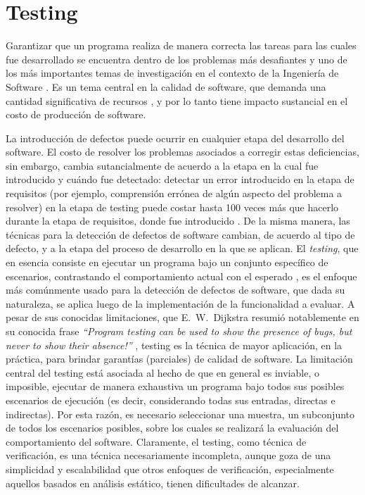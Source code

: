 \chapter[Testing]{Testing}
\label{cap:preliminares.testing}

Garantizar que un programa realiza de manera correcta las tareas para las cuales fue desarrollado se encuentra dentro de los problemas m\'as desafiantes y uno de los m\'as importantes temas de investigaci\'on en el contexto de la Ingenier\'ia de Software \cite{bibliography.books.GhezziBook,bibliography.books.PressmanBook,DBLP:series/txcs/Jalote05}. Es un tema central en la calidad de software, que demanda una cantidad significativa de recursos \cite{bibliography.books.JaloteBook}, y por lo tanto tiene impacto sustancial en el costo de producci\'on de software. 

La introducci\'on de defectos puede ocurrir en cualquier etapa del desarrollo del software. El costo de resolver los problemas asociados a corregir estas deficiencias, sin embargo, cambia sutancialmente de acuerdo a la etapa en la cual fue introducido y cu\'ando fue detectado: detectar un error introducido en la etapa de requisitos (por ejemplo, comprensi\'on err\'onea de alg\'un aspecto del problema a resolver) en la etapa de testing puede costar hasta 100 veces m\'as que hacerlo durante la etapa de requisitos, donde fue introducido \cite{bibliography.books.JaloteBook}. De la misma manera, las t\'ecnicas para la detecci\'on de defectos de software cambian, de acuerdo al tipo de defecto, y a la etapa del proceso de desarrollo en la que se aplican. El \emph{testing}, que en esencia consiste en ejecutar un programa bajo un conjunto espec\'ifico de escenarios, contrastando el comportamiento actual con el esperado \cite{bibliography.books.AmmannOffutt}, es el enfoque m\'as com\'unmente usado para la detecci\'on de defectos de software, que dada su naturaleza, se aplica luego de la implementaci\'on de la funcionalidad a evaluar. A pesar de sus conocidas limitaciones, que E.~W.~Dijkstra resumi\'o notablemente en su conocida frase \emph{``Program testing can be used to show the presence of bugs, but never to show their absence!''} \cite{Dijkstra:1972:CIN:1243380.1243381}, testing es la t\'ecnica de mayor aplicaci\'on, en la pr\'actica, para brindar garant\'ias (parciales) de calidad de software. La limitaci\'on central del testing est\'a asociada al hecho de que en general es inviable, o imposible, ejecutar de manera exhaustiva un programa bajo todos sus posibles escenarios de ejecuci\'on (es decir, considerando todas sus entradas, directas e indirectas). Por esta raz\'on, es necesario seleccionar una muestra, un subconjunto de todos los escenarios posibles, sobre los cuales se realizar\'a la evaluaci\'on del comportamiento del software. Claramente, el testing, como t\'ecnica de verificaci\'on, es una t\'ecnica necesariamente incompleta, aunque goza de una simplicidad y escalabilidad que otros enfoques de verificaci\'on, especialmente aquellos basados en an\'alisis est\'atico, tienen dificultades de alcanzar.

